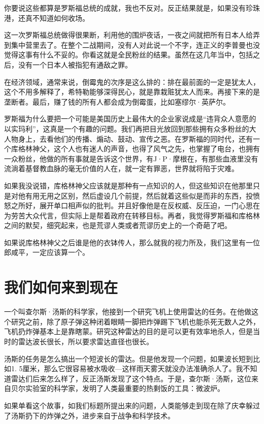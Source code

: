 你要说这些都算是罗斯福总统的成就，我也不反对。反正结果就是，如果没有珍珠港，还真不知道如何收场。

这一次罗斯福总统做得很果断，利用他的围炉夜话，一夜之间就把所有日本人给弄到集中营里去了。在整个二战期间，没有人对此说一个不字，连正义的李普曼也没觉得这事有什么不妥的。你看这就是全民粉丝的结果。虽然在这几年当中，包括之后，没有一个日本人被指犯有通敌之罪。

在经济领域，通常来说，倒霉鬼的次序是这么排的：排在最前面的一定是犹太人，这个不用多解释了，希特勒能够深得民心，就是靠栽赃犹太人而来。再接下来的是垄断者。最后，赚了钱的所有人都会成为倒霉蛋，比如塞缪尔·英萨尔。

罗斯福为什么要把一个可能是美国历史上最伟大的企业家说成是``违背众人意愿的以实玛利''，这真是一个有趣的问题。我们再把目光放回到那些拥有众多粉丝的大人物身上，去看他们的传播、煽动、鼓动、宣传之恶。在罗斯福的同时代，还有一个库格林神父，这个人也有迷人的声音，也得了风气之先，也掌握了电台，也拥有一众粉丝，他做的所有事就是告诉这个世界，有J·P·摩根在，有那些血液里没有流淌着基督教血脉的毫无价值的人在，就一定有罪恶，世界就将陷于灾难。

如果我没说错，库格林神父应该就是那种有一点知识的人，但这些知识在他那里只是对他有用无用之区别，然后虚设几个前提，然后就着这些似是而非的东西，投愤怒之所好，展开单口相声似的批判。并且好像他是在反权威、反压迫，一门心思在为劳苦大众代言，但实际上是帮着政府在转移目标。再者，我觉得罗斯福和库格林之间的默契，细究起来，也是荒谬人类或者荒谬历史上的一个奇葩了吧。

如果说库格林神父之后谁是他的衣钵传人，那么就我的视力所及，我们这里有一位郎咸平，一定应该算一个。

\section{我们如何来到现在}

一个叫查尔斯·汤斯的科学家，他接到一个研究飞机上使用雷达的任务。在他做这个研究之前，除了原子弹这种闭着眼睛一脚把炸弹踢下飞机也能杀死无数人之外，飞机扔炸弹基本上是靠瞎蒙。研究这种雷达的目的是可以更有效率地杀人，但是当时的雷达波长很长，所以要求雷达直径也很长。

汤斯的任务是怎么搞出一个短波长的雷达。但是他发现一个问题，如果波长短到比如1.
5厘米，那么它很容易被水吸收---这样雨天雾天就没办法准确杀人了。我不知道雷达们后来怎么样了，反正汤斯发现了这个特点。于是，查尔斯·汤斯，这位来自贝尔实验室的科学家，发明了人类最重要的热剩饭的工具：微波炉。

如果单看这个故事，如我们标题所提出来的问题，人类能够走到现在除了庆幸躲过了汤斯扔下的炸弹之外，进步来自于战争和科学技术。

